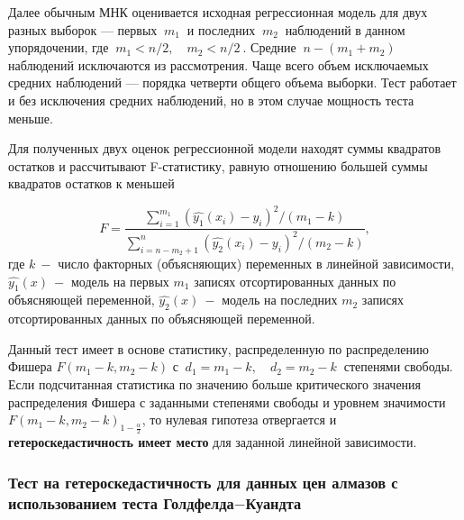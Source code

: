 \documentclass[
]{article}
\begin{document}
Далее обычным МНК оценивается исходная регрессионная модель для двух
разных выборок --- первых \(\ m_1\ \) и последних \(\ m_2\ \) наблюдений
в данном упорядочении, где \(\ m_1 < n / 2, \quad m_2 < n/2\ \). Средние
\(\ n - (m_1 + m_2)\ \) наблюдений исключаются из рассмотрения. Чаще
всего объем исключаемых средних наблюдений --- порядка четверти общего
объема выборки. Тест работает и без исключения средних наблюдений, но в
этом случае мощность теста меньше.

Для полученных двух оценок регрессионной модели находят суммы квадратов
остатков и рассчитывают F-статистику, равную отношению большей суммы
квадратов остатков к меньшей

\[
{\displaystyle F={\frac {\sum \limits_{i=1}^{m_1} \left( \hat{y_1}(x_i) - y_i \right)^2 /(m_1-k)}{\sum \limits_{i=n-m_2 + 1}^{n} \left( \hat{y_2}(x_i) - y_i \right)^2/(m_2-k)}}},
\] где \(k\ -\) число факторных (объясняющих) переменных в линейной
зависимости, \(\hat{y_1}(x)\ -\) модель на первых \(m_1\) записях
отсортированных данных по объясняющей переменной, \(\hat{y_2}(x)\ -\)
модель на последних \(m_2\) записях отсортированных данных по
объясняющей переменной.

Данный тест имеет в основе статистику, распределенную по распределению
Фишера \(F(m_1-k, m_2-k)\) с \(\ d_1 = m_1 - k,\quad d_2 = m_2-k\ \)
степенями свободы. Если подсчитанная статистика по значению больше
критического значения распределения Фишера с заданными степенями свободы
и уровнем значимости \(F(m_1-k, m_2-k)_{1- \frac{\alpha}{2}}\), то
нулевая гипотеза отвергается и \textbf{гетероскедастичность имеет место}
для заданной линейной зависимости.

\hypertarget{ux442ux435ux441ux442-ux43dux430-ux433ux435ux442ux435ux440ux43eux441ux43aux435ux434ux430ux441ux442ux438ux447ux43dux43eux441ux442ux44c-ux434ux43bux44f-ux434ux430ux43dux43dux44bux445-ux446ux435ux43d-ux430ux43bux43cux430ux437ux43eux432-ux441-ux438ux441ux43fux43eux43bux44cux437ux43eux432ux430ux43dux438ux435ux43c-ux442ux435ux441ux442ux430-ux433ux43eux43bux434ux444ux435ux43bux434ux430-ux43aux443ux430ux43dux434ux442ux430}{%
\subsubsection{\texorpdfstring{\textbf{Тест на гетероскедастичность для
данных цен алмазов с использованием теста
Голдфелда\(-\)Куандта}}{Тест на гетероскедастичность для данных цен алмазов с использованием теста Голдфелда-Куандта}}\label{ux442ux435ux441ux442-ux43dux430-ux433ux435ux442ux435ux440ux43eux441ux43aux435ux434ux430ux441ux442ux438ux447ux43dux43eux441ux442ux44c-ux434ux43bux44f-ux434ux430ux43dux43dux44bux445-ux446ux435ux43d-ux430ux43bux43cux430ux437ux43eux432-ux441-ux438ux441ux43fux43eux43bux44cux437ux43eux432ux430ux43dux438ux435ux43c-ux442ux435ux441ux442ux430-ux433ux43eux43bux434ux444ux435ux43bux434ux430-ux43aux443ux430ux43dux434ux442ux430}}
\end{document}
